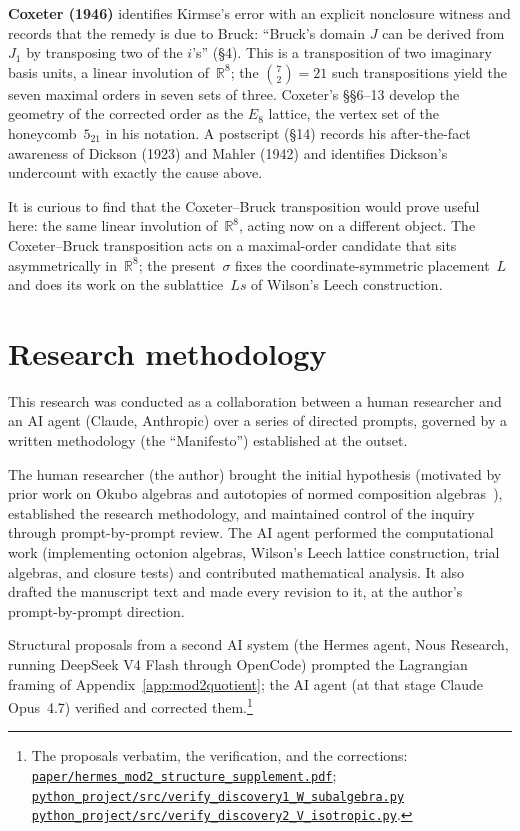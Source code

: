 \documentclass[twoside,english]{paper}
\numberwithin{equation}{section}
\numberwithin{figure}{section}
\theoremstyle{definition}
\theoremstyle{remark}
\newcommand{\RR}{\mathbb{R}}
\newcommand{\scriptref}[1]{\cite{repo}~%
  \href{https://github.com/koeplinger/leech\_alg/blob/main/python\_project/src/#1}%
  {\nolinkurl{python_project/src/#1}}}
\begin{document}
\noindent\textbf{Coxeter (1946)} \cite{Coxeter1946} identifies
Kirmse's error with an explicit nonclosure witness and records that
the remedy is due to Bruck: ``Bruck's domain $J$ can be
derived from $J_1$ by transposing two of the $i$'s'' (\S4).  This is
a transposition of two imaginary basis units, a linear involution
of~$\RR^8$; the $\binom72 = 21$ such transpositions yield the seven
maximal orders in seven sets of three.  Coxeter's \S\S6--13 develop the
geometry of the corrected order as the $E_8$ lattice, the vertex set of
the honeycomb~$5_{21}$ in his notation.  A postscript (\S14)
records his after-the-fact awareness of Dickson (1923) and Mahler (1942) and
identifies Dickson's undercount with exactly the cause above.

It is curious to find that the Coxeter--Bruck transposition would
prove useful here: the same linear involution of~$\RR^8$, acting
now on a different object.  The Coxeter--Bruck transposition acts
on a maximal-order candidate that sits asymmetrically in~$\RR^8$;
the present~$\sigma$ fixes the coordinate-symmetric placement~$L$
and does its work on the sublattice~$Ls$ of Wilson's Leech
construction.

\section{Research methodology}\label{sec:methodology}

This research was conducted as a collaboration between a human
researcher and an AI agent (Claude, Anthropic) over a series of
directed prompts, governed by a written methodology (the
``Manifesto'') established at the outset.

The human researcher (the author) brought the initial hypothesis
(motivated by prior work on Okubo algebras and autotopies of normed
composition algebras~\cite{Koeplinger2023}), established the research methodology, and
maintained control of the inquiry through prompt-by-prompt review.
The AI agent performed the computational work (implementing octonion
algebras, Wilson's Leech lattice construction, trial algebras, and
closure tests) and contributed mathematical analysis.  It also drafted
the manuscript text and made every revision to it, at the author's
prompt-by-prompt direction.

Structural proposals from a second AI system (the Hermes agent, Nous
Research, running DeepSeek V4 Flash through OpenCode) prompted the
Lagrangian framing of Appendix~\ref{app:mod2quotient}; the AI agent
(at that stage Claude Opus~4.7) verified and corrected them.\footnote{The proposals
verbatim, the verification, and the corrections: \cite{repo}~%
\href{https://github.com/koeplinger/leech\_alg/blob/main/paper/hermes\_mod2\_structure\_supplement.pdf}%
{\nolinkurl{paper/hermes_mod2_structure_supplement.pdf}};
\scriptref{verify\_discovery1\_W\_subalgebra.py}
\scriptref{verify\_discovery2\_V\_isotropic.py}.}
\end{document}
